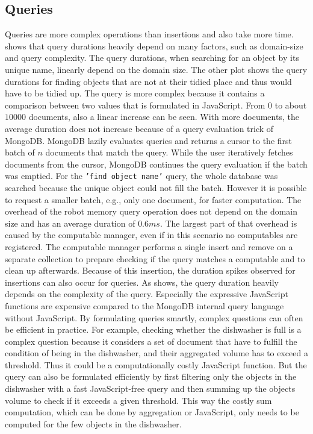\subsection{Queries}
\label{sec:queries}
Queries are more complex operations than insertions and also take more
time.  shows that query durations heavily
depend on many factors, such as domain-size and query complexity. The
query durations, when searching for an object by its unique name,
linearly depend on the domain size. The other plot shows the query
durations for finding objects that are not at their tidied place
and thus would have to be tidied up. The query is more complex
because it contains a comparison between two values that is formulated
in JavaScript. From $0$ to about $10000$ documents, also a linear
increase can be seen. With more documents, the average duration does
not increase because of a query evaluation trick of MongoDB. MongoDB
lazily evaluates queries and returns a cursor to the first batch of
$n$ documents that match the query. While the user iteratively fetches
documents from the cursor, MongoDB continues the query evaluation if
the batch was emptied. For the \texttt{'find object name'} query, the whole
database was searched because the unique object could not fill the
batch. However it is possible to request a smaller batch, e.g., only
one document, for faster computation. The overhead of the robot memory query operation does not
depend on the domain size and has an average duration of $0.6ms$. The
largest part of that overhead is caused by the computable manager,
even if in this scenario no computables are registered. The computable
manager performs a single insert and remove on a separate collection
to prepare checking if the query matches a computable and to clean up
afterwards. Because of this insertion, the duration spikes observed
for insertions can also occur for queries. As 
shows, the query duration heavily depends on the complexity of the
query. Especially the expressive JavaScript functions are expensive
compared to the MongoDB internal query language without JavaScript. By
formulating queries smartly, complex questions can often be
efficient in practice. For example, checking whether the dishwasher
is full is a complex question because it considers a set of document
that have to fulfill the condition of being in the dishwasher, and
their aggregated volume has to exceed a threshold. Thus it could be a
computationally costly JavaScript function. But the query can also be formulated efficiently
by first filtering only the objects in the dishwasher with a fast
JavaScript-free query and then summing up the objects volume to check
if it exceeds a given threshold. This way the costly sum computation,
which can be done by aggregation or JavaScript, only needs to be
computed for the few objects in the dishwasher.

